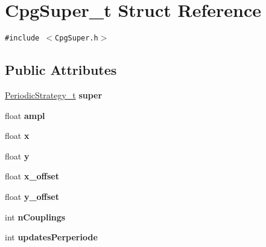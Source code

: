 \hypertarget{structCpgSuper__t}{
\section{CpgSuper\_\-t Struct Reference}
\label{structCpgSuper__t}
}
{\tt \#include $<$CpgSuper.h$>$}

\subsection*{Public Attributes}
\begin{CompactItemize}
\item 
\hypertarget{structCpgSuper__t_a99be9897c811aa86c604e108749b7c9}{
\hyperlink{structPeriodicStrategy__t}{PeriodicStrategy\_\-t} \textbf{super}}
\label{structCpgSuper__t_a99be9897c811aa86c604e108749b7c9}

\item 
\hypertarget{structCpgSuper__t_21e6439bdeaa0165c66bac3cea9af1ca}{
float \textbf{ampl}}
\label{structCpgSuper__t_21e6439bdeaa0165c66bac3cea9af1ca}

\item 
\hypertarget{structCpgSuper__t_08ee6790801eb58b97bbfeb3a2e03c0f}{
float \textbf{x}}
\label{structCpgSuper__t_08ee6790801eb58b97bbfeb3a2e03c0f}

\item 
\hypertarget{structCpgSuper__t_180e03f752e560a01701f259d093e210}{
float \textbf{y}}
\label{structCpgSuper__t_180e03f752e560a01701f259d093e210}

\item 
\hypertarget{structCpgSuper__t_bb63f43c57d17fec04d7d74860b6ed8a}{
float \textbf{x\_\-offset}}
\label{structCpgSuper__t_bb63f43c57d17fec04d7d74860b6ed8a}

\item 
\hypertarget{structCpgSuper__t_6657da40144f580d221bce9a8088fe5a}{
float \textbf{y\_\-offset}}
\label{structCpgSuper__t_6657da40144f580d221bce9a8088fe5a}

\item 
\hypertarget{structCpgSuper__t_014344bdb123a5720ff44f0ca298a718}{
int \textbf{nCouplings}}
\label{structCpgSuper__t_014344bdb123a5720ff44f0ca298a718}

\item 
\hypertarget{structCpgSuper__t_72afafe73672ae5db638ca8cd89fd7c9}{
int \textbf{updatesPerperiode}}
\label{structCpgSuper__t_72afafe73672ae5db638ca8cd89fd7c9}

\end{CompactItemize}



